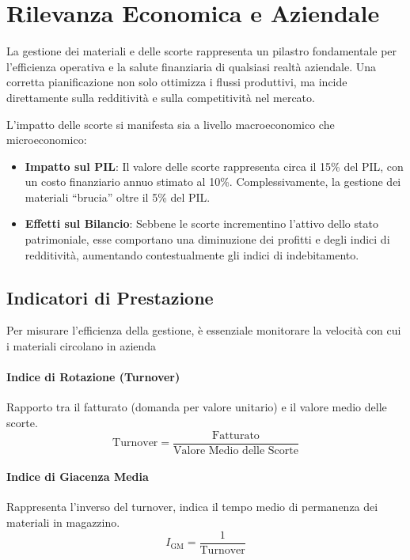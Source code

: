 %
\section{Rilevanza Economica e Aziendale}
La gestione dei materiali e delle scorte rappresenta un pilastro fondamentale per l'efficienza operativa e la salute finanziaria di qualsiasi realtà aziendale. Una corretta pianificazione non solo ottimizza i flussi produttivi, ma incide direttamente sulla redditività e sulla competitività nel mercato.

L'impatto delle scorte si manifesta sia a livello macroeconomico che microeconomico:
\begin{itemize}
    \item \textbf{Impatto sul PIL}: Il valore delle scorte rappresenta circa il 15\% del PIL, con un costo finanziario annuo stimato al 10\%. Complessivamente, la gestione dei materiali ``brucia'' oltre il 5\% del PIL.
    \item \textbf{Effetti sul Bilancio}: Sebbene le scorte incrementino l'attivo dello stato patrimoniale, esse comportano una diminuzione dei profitti e degli indici di redditività, aumentando contestualmente gli indici di indebitamento.
\end{itemize}

%
\subsection{Indicatori di Prestazione}
Per misurare l'efficienza della gestione, è essenziale monitorare la velocità con cui i materiali circolano in azienda
%
\paragraph{Indice di Rotazione (Turnover)} Rapporto tra il fatturato (domanda per valore unitario) e il valore medio delle scorte.
\[
    \text{Turnover} = \frac{\text{Fatturato}}{\text{Valore Medio delle Scorte}}
\]
%
\paragraph{Indice di Giacenza Media} Rappresenta l'inverso del turnover, indica il tempo medio di permanenza dei materiali in magazzino.
\[
    I_{\text{GM}} = \frac{1}{\text{Turnover}}
\]
%
